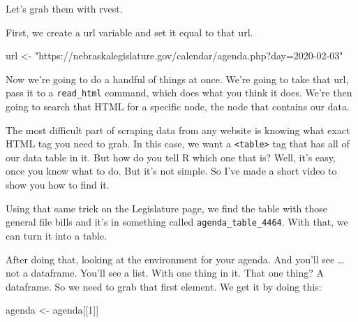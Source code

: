 \documentclass[]{book}
\newenvironment{Shaded}{\begin{snugshade}}{\end{snugshade}}
\newcommand{\DataTypeTok}[1]{\textcolor[rgb]{0.13,0.29,0.53}{#1}}
\newcommand{\DecValTok}[1]{\textcolor[rgb]{0.00,0.00,0.81}{#1}}
\newcommand{\KeywordTok}[1]{\textcolor[rgb]{0.13,0.29,0.53}{\textbf{#1}}}
\newcommand{\NormalTok}[1]{#1}
\newcommand{\OperatorTok}[1]{\textcolor[rgb]{0.81,0.36,0.00}{\textbf{#1}}}
\newcommand{\StringTok}[1]{\textcolor[rgb]{0.31,0.60,0.02}{#1}}
\begin{document}
Let's grab them with rvest.

First, we create a url variable and set it equal to that url.

\begin{Shaded}
\begin{Highlighting}[]
\NormalTok{url <-}\StringTok{ "https://nebraskalegislature.gov/calendar/agenda.php?day=2020-02-03"}
\end{Highlighting}
\end{Shaded}

Now we're going to do a handful of things at once. We're going to take that url, pass it to a \texttt{read\_html} command, which does what you think it does. We're then going to search that HTML for a specific node, the node that contains our data.

The most difficult part of scraping data from any website is knowing what exact HTML tag you need to grab. In this case, we want a \texttt{\textless{}table\textgreater{}} tag that has all of our data table in it. But how do you tell R which one that is? Well, it's easy, once you know what to do. But it's not simple. So I've made a short video to show you how to find it.

Using that same trick on the Legislature page, we find the table with those general file bills and it's in something called \texttt{agenda\_table\_4464}. With that, we can turn it into a table.

\begin{Shaded}
\end{Shaded}

After doing that, looking at the environment for your agenda. And you'll see \ldots{} not a dataframe. You'll see a list. With one thing in it. That one thing? A dataframe. So we need to grab that first element. We get it by doing this:

\begin{Shaded}
\begin{Highlighting}[]
\NormalTok{agenda <-}\StringTok{ }\NormalTok{agenda[[}\DecValTok{1}\NormalTok{]]}
\end{Highlighting}
\end{Shaded}
\end{document}
